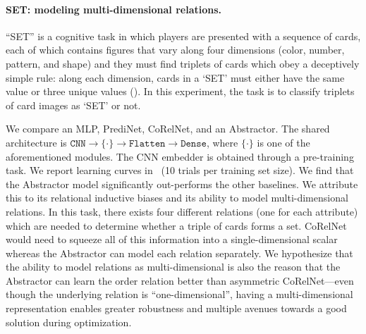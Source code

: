 \paragraph{SET: modeling multi-dimensional relations.}
``SET'' is a cognitive task in which 
players are presented with a sequence of cards, each of which contains figures that vary along four dimensions (color, number, pattern, and shape) and they must find triplets of cards which obey a deceptively simple rule: along each dimension, cards in a `SET' must either have the same value or three unique values (). %
In this experiment, the task is to classify triplets of card images as `SET' or not.

We compare an MLP, PrediNet, CoRelNet, and an Abstractor. The shared architecture is $\texttt{CNN} \to \{\cdot\} \to \texttt{Flatten} \to \texttt{Dense}$, where $\{\cdot\}$ is one of the aforementioned modules. The CNN embedder is obtained through a pre-training task. We report learning curves in~ (10 trials per training set size). We find that the Abstractor model significantly out-performs the other baselines. We attribute this to its relational inductive biases and its ability to model multi-dimensional relations. In this task, there exists four different relations (one for each attribute) which are needed to determine whether a triple of cards forms a set. CoRelNet would need to squeeze all of this information into a single-dimensional scalar whereas the Abstractor can model each relation separately. We hypothesize that the ability to model relations as multi-dimensional is also the reason that the Abstractor can learn the order relation better than asymmetric CoRelNet---even though the underlying relation is ``one-dimensional'', having a multi-dimensional representation enables greater robustness and multiple avenues towards a good solution during optimization.

